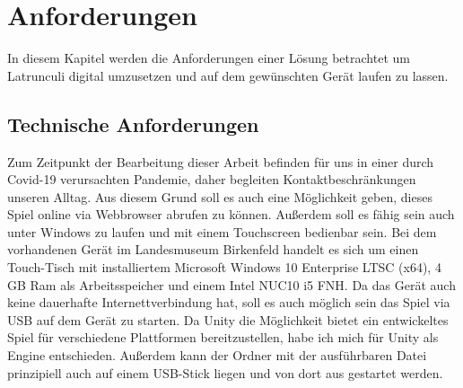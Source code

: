
\chapter{Anforderungen}
\label{ch:Analyse}
In diesem Kapitel werden die Anforderungen einer Lösung betrachtet um Latrunculi digital umzusetzen und auf dem gewünschten Gerät laufen zu lassen.


\section{Technische Anforderungen}
\label{ch:Analyse:sec:TechAnforderungen}
Zum Zeitpunkt der Bearbeitung dieser Arbeit befinden für uns in einer durch Covid-19 verursachten Pandemie, daher begleiten Kontaktbeschränkungen unseren Alltag. Aus diesem Grund soll es auch eine Möglichkeit geben, dieses Spiel online via Webbrowser abrufen zu können. Außerdem soll es fähig sein auch unter Windows zu laufen und mit einem Touchscreen bedienbar sein. Bei dem vorhandenen Gerät im Landesmuseum Birkenfeld handelt es sich um einen Touch-Tisch mit installiertem Microsoft Windows 10 Enterprise LTSC (x64), 4 GB Ram als Arbeitsspeicher und einem Intel NUC10 i5 FNH. Da das Gerät auch keine dauerhafte Internettverbindung hat, soll es auch möglich sein das Spiel via USB auf dem Gerät zu starten. Da Unity die Möglichkeit bietet ein entwickeltes Spiel für verschiedene Plattformen bereitzustellen, habe ich mich für Unity als Engine entschieden. Außerdem kann der Ordner mit der ausführbaren Datei prinzipiell auch auf einem USB-Stick liegen und von dort aus gestartet werden.

